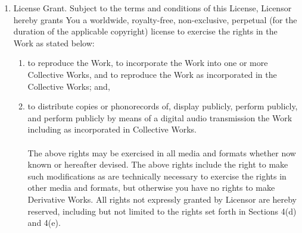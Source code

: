 \begin{enumerate}
  \item {License Grant. Subject to the terms and conditions of this License,
  Licensor hereby grants You a worldwide, royalty-free, non-exclusive, perpetual
  (for the duration of the applicable copyright) license to exercise the rights
  in the Work as stated below:}
  \begin {enumerate} 
    \item {to reproduce the Work, to incorporate the Work into one or more
    Collective Works, and to reproduce the Work as incorporated in the
    Collective Works; and,}
    \item {to distribute copies or phonorecords of, display publicly, perform
    publicly, and perform publicly by means of a digital audio transmission the
    Work including as incorporated in Collective Works.}
\\ \\
  The above rights may be exercised in all media and formats whether now known
  or hereafter devised. The above rights include the right to make such
  modifications as are technically necessary to exercise the rights in other
  media and formats, but otherwise you have no rights to make Derivative Works.
  All rights not expressly granted by Licensor are hereby reserved, including
  but not limited to the rights set forth in Sections 4(d) and 4(e).  
  \end {enumerate}


\end{enumerate}
